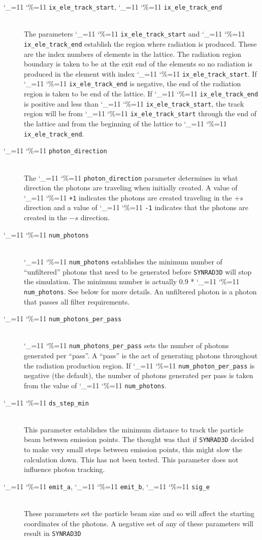\documentclass[11pt]{article}
\newcommand{\srthree}{\texttt{SYNRAD3D}\xspace}
\newcommand\ttcmd{\begingroup\catcode`\_=11 \catcode`\%=11 \dottcmd}
\newcommand\dottcmd[1]{\texttt{#1}\endgroup}
\newcommand{\vn}{\ttcmd}
\newcommand{\Newline}{\hfil \\}
\begin{document}
  \begin{description}
  \item[\vn{ix_ele_track_start}, \vn{ix_ele_track_end}] \Newline
The parameters \vn{ix_ele_track_start} and \vn{ix_ele_track_end} establish
the region where radiation is produced. These are the index numbers of 
elements in the lattice. The radiation region boundary is taken to be at
the exit end of the elements so no radiation is produced in the element
with index \vn{ix_ele_track_start}. If \vn{ix_ele_track_end} is negative,
the end of the radiation region is taken to be end of the lattice.
If \vn{ix_ele_track_end} is positive and less than \vn{ix_ele_track_start},
the track region will be from \vn{ix_ele_track_start} through the
end of the lattice and from the beginning of the lattice to \vn{ix_ele_track_end}.
  \item[\vn{photon_direction}] \Newline
The \vn{photon_direction} parameter determines in what direction the photons
are traveling when initially created. A value of \vn{+1} indicates the photons
are created traveling in the $+s$ direction and a value of \vn{-1} indicates
that the photons are created in the $-s$ direction.
  \item[\vn{num_photons}] \Newline
\vn{num_photons} establishes the minimum number of ``unfiltered''
photons that need to be generated before \srthree will stop the
simulation. The minimum number is actually 0.9 * \vn{num_photons}. See
below for more details. An unfiltered photon is a photon that passes
all filter requirements.  
  \item[\vn{num_photons_per_pass}] \Newline
\vn{num_photons_per_pass} sets the number of photons generated per
``pass''.  A ``pass'' is the act of generating photons throughout the
radiation production region. If \vn{num_photon_per_pass} is negative
(the default), the number of photons generated per pass is taken from
the value of \vn{num_photons}.
  \item[\vn{ds_step_min}] \Newline
This parameter establishes the minimum distance to track the particle beam between emission
points. The thought was that if \srthree decided to make very small steps  between emission
points, this might slow the calculation down. This has not been tested. This parameter
does not influence photon tracking.
  \item[\vn{emit_a}, \vn{emit_b}, \vn{sig_e}] \Newline
These parameters set the particle beam size and so will affect the starting coordinates of
the photons. A negative set of any of these parameters will result in \srthree 

\end{description}
\end{document}
